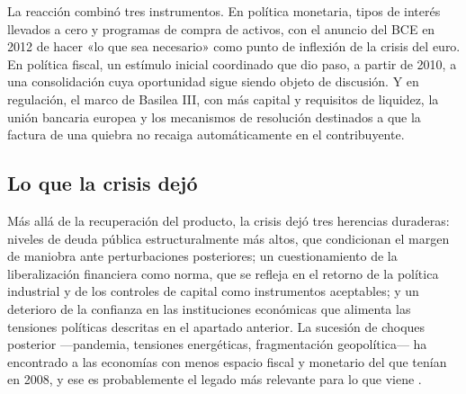 La reacción combinó tres instrumentos. En política monetaria, tipos de interés
llevados a cero y programas de compra de activos, con el anuncio del BCE en 2012
de hacer «lo que sea necesario» como punto de inflexión de la crisis del euro.
En política fiscal, un estímulo inicial coordinado que dio paso, a partir de
2010, a una consolidación cuya oportunidad sigue siendo objeto de discusión. Y
en regulación, el marco de Basilea III, con más capital y requisitos de
liquidez, la unión bancaria europea y los mecanismos de resolución destinados a
que la factura de una quiebra no recaiga automáticamente en el contribuyente.

\subsection{Lo que la crisis dejó}

Más allá de la recuperación del producto, la crisis dejó tres herencias
duraderas: niveles de deuda pública estructuralmente más altos, que condicionan
el margen de maniobra ante perturbaciones posteriores; un cuestionamiento de la
liberalización financiera como norma, que se refleja en el retorno de la
política industrial y de los controles de capital como instrumentos aceptables;
y un deterioro de la confianza en las instituciones económicas que alimenta las
tensiones políticas descritas en el apartado anterior. La sucesión de choques
posterior —pandemia, tensiones energéticas, fragmentación geopolítica— ha
encontrado a las economías con menos espacio fiscal y monetario del que tenían
en 2008, y ese es probablemente el legado más relevante para lo que viene
\parencite{alonso2021}.

